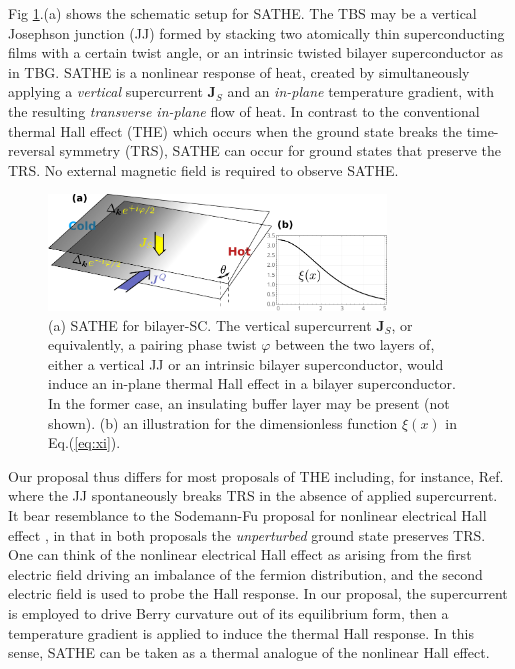 Fig \ref{fig: setup}.(a) shows the schematic setup for SATHE. The TBS may be a vertical Josephson junction (JJ) formed by stacking two atomically thin superconducting films with a certain twist angle, or an intrinsic twisted bilayer superconductor as in TBG. SATHE is a nonlinear response of heat, created by simultaneously applying a \emph{vertical} supercurrent $\bm J_S$ and an {\it in-plane} temperature gradient, with the resulting {\it transverse in-plane} flow of heat. In contrast to the conventional thermal Hall effect (THE) which occurs when the ground state breaks the time-reversal symmetry (TRS), SATHE can occur for ground states that preserve the TRS. No external magnetic field is required to observe SATHE. 

\begin{figure}[!ht]
	\centering
	\includegraphics[width=0.8\textwidth]{contents/SATHE/figures/illustration.pdf}
	\caption{(a) SATHE for bilayer-SC. The vertical supercurrent $\bm{J}_S$, or equivalently, a pairing phase twist $\varphi$ between the two layers of, either a vertical JJ or an intrinsic bilayer superconductor, would induce an in-plane thermal Hall effect in a bilayer superconductor. In the former case, an insulating buffer layer may be present (not shown).  (b) an illustration for the dimensionless function $\xi(x)$ in Eq.(\ref{eq:xi}).}
	\label{fig: setup}
\end{figure}

Our proposal thus differs for most proposals of THE including, for instance, Ref. \cite{can2021high} where the JJ spontaneously breaks TRS in the absence of applied supercurrent. It bear resemblance to the Sodemann-Fu proposal for nonlinear electrical Hall effect \cite{sodemann2015quantum,ma2019observation}, in that in both proposals the \emph{unperturbed} ground state preserves TRS. One can think of the nonlinear electrical Hall effect as arising from the first electric field driving an imbalance of the fermion distribution, and the second electric field is used to probe the Hall response. In our proposal, the supercurrent is employed to drive Berry curvature out of its equilibrium form, then a temperature gradient is applied to induce the thermal Hall response. In this sense, SATHE can be taken as a thermal analogue of the nonlinear Hall effect.

